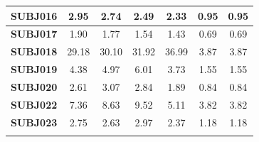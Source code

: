 \documentclass[idxtotoc,hyperref,openany]{labbook} %
\begin{document}
\begin{table}[]
\begin{tabular}{ccccccc}
		\multicolumn{1}{|c|}{\textbf{SUBJ016}}  & \multicolumn{1}{c|}{2.95}              & \multicolumn{1}{c|}{2.74}              & \multicolumn{1}{c|}{2.49}              & \multicolumn{1}{c|}{2.33}         & \multicolumn{1}{c|}{0.95}               & \multicolumn{1}{c|}{0.95}               \\ \hline
		\multicolumn{1}{|c|}{\textbf{SUBJ017}}  & \multicolumn{1}{c|}{1.90}              & \multicolumn{1}{c|}{1.77}              & \multicolumn{1}{c|}{1.54}              & \multicolumn{1}{c|}{1.43}         & \multicolumn{1}{c|}{0.69}               & \multicolumn{1}{c|}{0.69}               \\ \hline
		\multicolumn{1}{|c|}{\textbf{SUBJ018}}  & \multicolumn{1}{c|}{29.18}             & \multicolumn{1}{c|}{30.10}             & \multicolumn{1}{c|}{31.92}             & \multicolumn{1}{c|}{36.99}        & \multicolumn{1}{c|}{3.87}               & \multicolumn{1}{c|}{3.87}               \\ \hline
		\multicolumn{1}{|c|}{\textbf{SUBJ019}}  & \multicolumn{1}{c|}{4.38}              & \multicolumn{1}{c|}{4.97}              & \multicolumn{1}{c|}{6.01}              & \multicolumn{1}{c|}{3.73}         & \multicolumn{1}{c|}{1.55}               & \multicolumn{1}{c|}{1.55}               \\ \hline
		\multicolumn{1}{|c|}{\textbf{SUBJ020}}  & \multicolumn{1}{c|}{2.61}              & \multicolumn{1}{c|}{3.07}              & \multicolumn{1}{c|}{2.84}              & \multicolumn{1}{c|}{1.89}         & \multicolumn{1}{c|}{0.84}               & \multicolumn{1}{c|}{0.84}               \\ \hline
		\multicolumn{1}{|c|}{\textbf{SUBJ022}}  & \multicolumn{1}{c|}{7.36}              & \multicolumn{1}{c|}{8.63}              & \multicolumn{1}{c|}{9.52}              & \multicolumn{1}{c|}{5.11}         & \multicolumn{1}{c|}{3.82}               & \multicolumn{1}{c|}{3.82}               \\ \hline
		\multicolumn{1}{|c|}{\textbf{SUBJ023}}  & \multicolumn{1}{c|}{2.75}              & \multicolumn{1}{c|}{2.63}              & \multicolumn{1}{c|}{2.97}              & \multicolumn{1}{c|}{2.37}         & \multicolumn{1}{c|}{1.18}               & \multicolumn{1}{c|}{1.18}               \\ \hline
		\textbf{}                               &                                        &                                        &                                        &                                   &                                         &                                         \\ \hline

\end{tabular}
\end{table}
\end{document}
